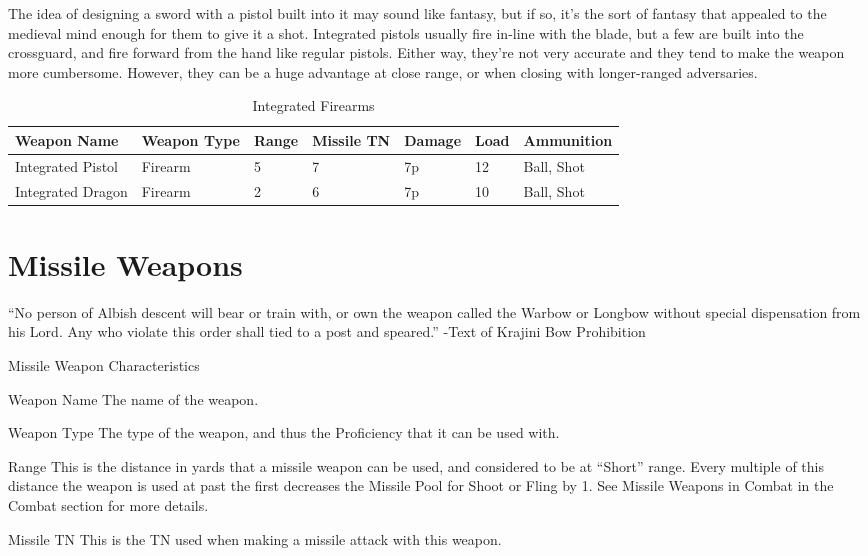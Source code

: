 \documentclass[oneside,11pt,english]{book}
\begin{document}
The idea of designing a sword with a pistol built into it may sound like fantasy, but if so, it’s the sort of fantasy that appealed to the medieval mind enough for them to give it a shot. Integrated pistols usually fire in-line with the blade, but a few are built into the crossguard, and fire forward from the hand like regular pistols. Either way, they’re not very accurate and they tend to make the weapon more cumbersome. However, they can be a huge advantage at close range, or when closing with longer-ranged adversaries.
\begin{table}[!ht]
	\caption{Integrated Firearms}
	\label{tab:Integrated Firearms}
	\begin{tabu} to 
Weapon Name &Weapon Type &Range &Missile TN &Damage &Load &Ammunition\\\toprule
Integrated Pistol &Firearm &5 &7 &7p &12 &Ball, Shot\\
Integrated Dragon &Firearm &2 &6 &7p &10 &Ball, Shot\\
	\end{tabu}
\end{table}

\chapter{Missile Weapons}\label{ch:Missile Weapons}
\startcontents[chapters]
\clearpage
“No person of Albish descent will bear or train with, or own the weapon called the Warbow or Longbow without special dispensation from his Lord. Any who violate this order shall tied to a post and speared.” -Text of Krajini Bow Prohibition 

Missile Weapon Characteristics 


Weapon Name 
The name of the weapon.

Weapon Type 
The type of the weapon, and thus the Proficiency that it can be used with. 

 

Range 
This is the distance in yards that a missile weapon can be used, and considered to be at “Short” range. 
Every multiple of this distance the weapon is used at past the first decreases the Missile Pool for Shoot or 
Fling by 1. See Missile Weapons in Combat in the Combat section for more details. 


 

Missile TN 
This is the TN used when making a missile attack with this weapon. 
\end{document}
